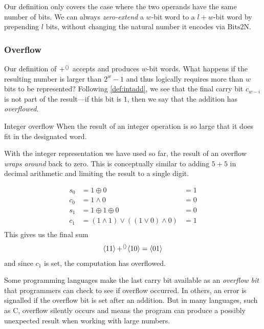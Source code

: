 Our definition only covers the case where the two operands have the
same number of bits.  We can always \emph{zero-extend} a $w$-bit word
to a $l+w$-bit word by prepending $l$ bits, without changing the
natural number it encodes via $\mathrm{Bits2N}$.

\subsubsection{Overflow}

Our definition of $\operatorname{+^{\langle\rangle}}$ accepts and produces $w$-bit words.  What
happens if the resulting number is larger than $2^{w}-1$ and thus
logically requires more than $w$ bits to be represented?  Following
\cref{def:intadd}, we see that the final carry bit $c_{w-i}$ is not
part of the result---if this bit is $1$, then we say that the addition
has \emph{overflowed}.

\begin{definition}{Integer overflow}
  When the result of an integer operation is so large that it does fit
  in the designated word.
\end{definition}

With the integer representation we have used so far, the result of an
overflow \emph{wraps around} back to zero.  This is conceptually
similar to adding $5+5$ in decimal arithmetic and limiting the result
to a single digit.

\begin{example}
  \begin{align*}
    s_{0} &= 1 \oplus 0 &= 1 \\
    c_{0} &= 1 \land 0 &= 0 \\
    s_{1} &= 1 \oplus 1 \oplus 0 &= 0 \\
    c_{1} &= (1 \land 1) \lor ((1\lor 0) \land 0) &= 1 \\
  \end{align*}
  This gives us the final sum
  \begin{align*}
    \langle 11 \rangle \operatorname{+^{\langle\rangle}} \langle 10 \rangle = \langle 01 \rangle
  \end{align*}
  and since $c_{1}$ is set, the computation has overflowed.
\end{example}

Some programming languages make the last carry bit available as an
\emph{overflow bit} that programmers can check to see if overflow
occurred.  In others, an error is signalled if the overflow bit is set
after an addition.  But in many languages, such as C, overflow
silently occurs and means the program can produce a possibly
unexpected result when working with large numbers.

